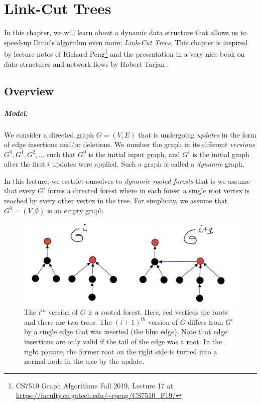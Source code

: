 \chapter{Link-Cut Trees}
\newcommand{\key}{\operatorname{key}}
\newcommand{\prio}{\operatorname{prio}}

In this chapter, we will learn about a dynamic data structure that allows us to speed-up Dinic's algorithm even more: \emph{Link-Cut Trees}. This chapter is inspired by lecture notes of Richard Peng\footnote{CS7510 Graph Algorithms Fall 2019, Lecture 17 at \url{https://faculty.cc.gatech.edu/~rpeng/CS7510\_F19/}} and the presentation in a very nice book on data structures and network flows by Robert Tarjan \cite{tarjan1983data}.

\section{Overview}

\paragraph{Model.} We consider a directed graph $G=(V,E)$ that is undergoing \emph{updates} in the form of edge insertions and/or deletions. We number the graph in its different \emph{versions} $G^0, G^1, G^2, \dots$ such that $G^0$ is the initial input graph, and $G^i$ is the initial graph after the first $i$ updates were applied. Such a graph is called a \emph{dynamic} graph.

In this lecture, we restrict ourselves to \emph{dynamic rooted forests} that is we assume that every $G^i$ forms a directed forest where in each forest a single root vertex is reached by every other vertex in the tree. For simplicity, we assume that $G^0 = (V, \emptyset)$ is an empty graph.

\begin{figure}[!ht]
    \centering
    \includegraphics[scale=0.2]{./fig/InsertionDynamicTree_lectureDynamicTree.jpeg}
    \caption{The $i^{th}$ version of $G$ is a rooted forest. Here, red vertices are roots and there are two trees. The $(i+1)^{th}$ version of $G$ differs from $G^i$ by a single edge that was inserted (the blue edge). Note that edge insertions are only valid if the tail of the edge was a root. In the right picture, the former root on the right side is turned into a normal node in the tree by the update.}
    \label{fig:my_label}
\end{figure}

